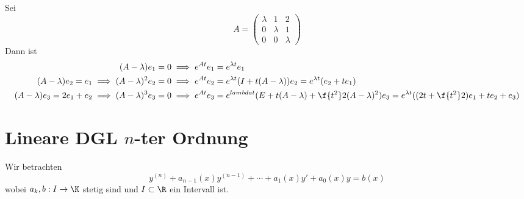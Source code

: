 \documentclass{mycourse}
\begin{document}
\begin{ex*}
	Sei
	\[
		A = \begin{pmatrix}\lambda & 1 & 2\\ 0& \lambda&1\\ 0& 0& \lambda\end{pmatrix}
	\]
	Dann ist
	\begin{align*}
		(A-\lambda)e_1 = 0 &\implies e^{At}e_1 = e^{\lambda t}e_1\\
		(A-\lambda)e_2 = e_1 \implies (A-\lambda)^2e_2 = 0 &\implies e^{At}e_2 = e^{\lambda t}(I+t(A-\lambda))e_2 = e^{\lambda t}(e_2 + t e_1)\\
		(A-\lambda)e_3 = 2e_1 + e_2 \implies (A-\lambda)^3e_3 = 0 &\implies e^{At}e_3 = e^{lambda t}(E + t(A-\lambda) + \f{t^2}2 (A-\lambda)^2) e_3 = e^{\lambda t}((2t + \f {t^2}2)e_1 + te_2 + e_3)
	\end{align*}
\end{ex*}


\section{Lineare DGL $n$-ter Ordnung}


Wir betrachten
\[
	y^{(n)} + a_{n-1}(x)y^{(n-1)} + \dotsb + a_1(x)y' + a_0(x)y = b(x)
\]
wobei $a_k, b : I\to \K$ stetig sind und $I\subset \R$ ein Intervall ist.
\end{document}
